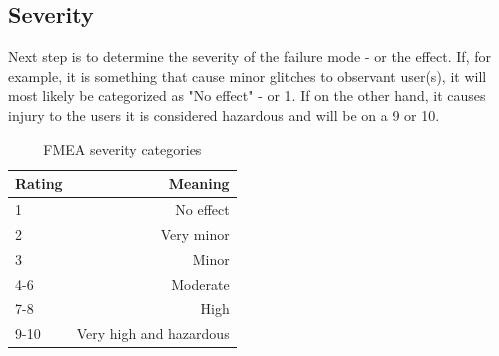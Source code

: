 \documentclass[10pt,oneside]{book}                  %
\begin{document}
\subsection{Severity}
\label{sec:fmea_severity}
Next step is to determine the severity of the failure mode - or the effect. If, for example, it is something that cause minor glitches to observant user(s), it will most likely be categorized as "No effect" - or 1.
If on the other hand, it causes injury to the users it is considered hazardous and will be on a 9 or 10.

\begin{table}[h]
\centering
    \begin{tabular}{ | l | r | }
    \hline
    Rating & Meaning \\ \hline \hline
    1      & No effect  \\ \hline
    2      & Very minor \\ \hline
    3      & Minor \\ \hline
    4-6    & Moderate \\ \hline
    7-8    & High \\ \hline
    9-10   & Very high and hazardous \\ \hline
    \end{tabular}
\caption{FMEA severity categories}
\label{table:fmea_severities}
\end{table}
\end{document}
